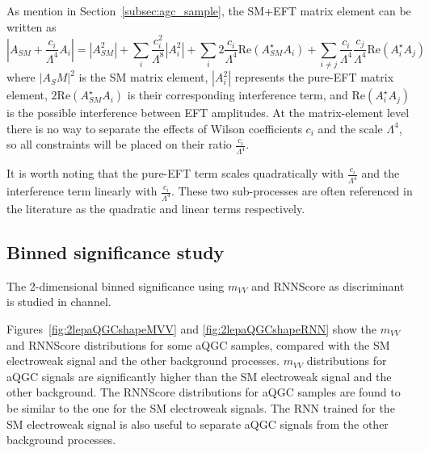 As mention in Section~\ref{subsec:agc_sample}, the SM+EFT matrix element can be written as
\begin{equation}
   |A_{SM}+\frac{c_i}{\Lambda^4}A_i|=|A_{SM}^2|+\sum\limits_i \frac{c_i^2}{\Lambda^8}|A_{i}^2|+ \sum\limits_i 2 \frac{c_i}{\Lambda^4} \mathrm{Re}(A_{SM}^\star A_i) +\sum\limits_{i\neq j} \frac{c_i}{\Lambda^4} \frac{c_j}{\Lambda^4} \mathrm{Re}(A_i^\star A_j)
\end{equation}
where $|A_SM|^2$ is the SM matrix element, $|A_{i}^2|$ represents the pure-EFT matrix element, $2 \mathrm{Re}(A_{SM}^\star A_i)$ is their corresponding interference term, and $\mathrm{Re}(A_i^\star A_j)$ is the possible interference between EFT amplitudes. 
At the matrix-element level there is no way to separate the effects of Wilson coefficients $c_i$ and the scale $\Lambda^4$, so all constraints will be placed on their ratio $\frac{c_i}{\Lambda^4}$.

It is worth noting that the pure-EFT term scales quadratically with $\frac{c_i}{\Lambda^4}$ and the interference term linearly with $\frac{c_i}{\Lambda^4}$. These two sub-processes are often referenced in the literature as the quadratic and linear terms respectively.


\subsection{Binned significance study}

The 2-dimensional binned significance using $m_{VV}$ and RNNScore as discriminant is studied in \tlep channel.

Figures~\ref{fig:2lepaQGCshapeMVV} and \ref{fig:2lepaQGCshapeRNN} show the $m_{VV}$ and RNNScore distributions for some aQGC samples, compared with the SM electroweak signal and the other background processes.
$m_{VV}$ distributions for aQGC signals are significantly higher than the SM electroweak signal and the other background.
The RNNScore distributions for aQGC samples are found to be similar to the one for the SM electroweak signals.
The RNN trained for the SM electroweak signal is also useful to separate aQGC signals from the other background processes.

